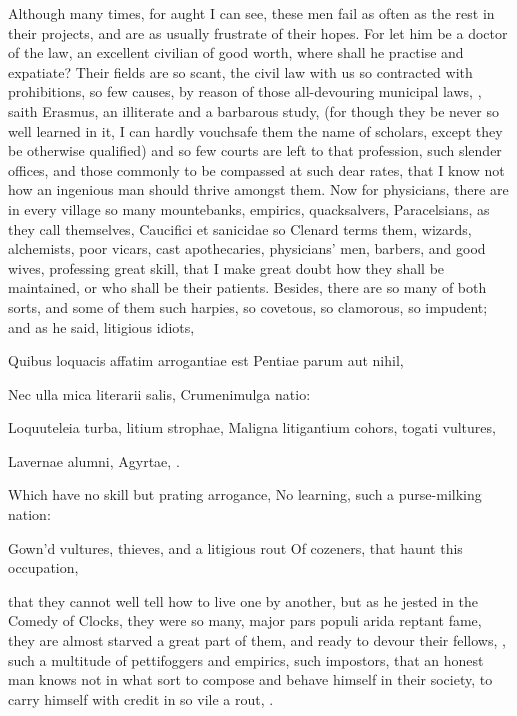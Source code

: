 {Although many times, for aught I can see, these men fail as often as
the rest in their projects, and are as usually frustrate of their
hopes. For let him be a doctor of the law, an excellent civilian of
good worth, where shall he practise and expatiate? Their fields are so
scant, the civil law with us so contracted with prohibitions, so few
causes, by reason of those all-devouring municipal laws, , saith Erasmus, an illiterate and a barbarous
study, (for though they be never so well learned in it, I can hardly
vouchsafe them the name of scholars, except they be otherwise
qualified) and so few courts are left to that profession, such slender
offices, and those commonly to be compassed at such dear rates, that I
know not how an ingenious man should thrive amongst them. Now for
physicians, there are in every village so many mountebanks, empirics,
quacksalvers, Paracelsians, as they call themselves, Caucifici et
sanicidae so Clenard terms them, wizards, alchemists, poor
vicars, cast apothecaries, physicians' men, barbers, and good wives,
professing great skill, that I make great doubt how they shall be
maintained, or who shall be their patients. Besides, there are so many
of both sorts, and some of them such harpies, so covetous, so
clamorous, so impudent; and as he said, litigious idiots,

\begin{latin}%
Quibus loquacis affatim arrogantiae est
Pentiae parum aut nihil,

Nec ulla mica literarii salis,
Crumenimulga natio:

Loquuteleia turba, litium strophae,
Maligna litigantium cohors, togati vultures,

Lavernae alumni, Agyrtae, \etc{}.%
\end{latin}

Which have no skill but prating arrogance,
No learning, such a purse-milking nation:

Gown'd vultures, thieves, and a litigious rout
Of cozeners, that haunt this occupation,

that they cannot well tell how to live one by another, but as he jested
in the Comedy of Clocks, they were so many, major pars populi
arida reptant fame, they are almost starved a great part of them, and
ready to devour their fellows, ,
such a multitude of pettifoggers and empirics, such impostors, that an
honest man knows not in what sort to compose and behave himself in
their society, to carry himself with credit in so vile a rout,
.

}
